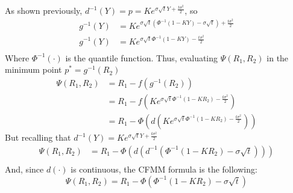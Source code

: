 \documentclass[12pt]{article}
\begin{document}
As shown previously, $d^{-1}(Y)     = p = K e^{\sigma \sqrt{t}Y + \frac{t\sigma^2}{2}}$, so
\begin{align*}
    g^{-1}(Y) & = K e^{\sigma \sqrt{t}\left(\Phi^{-1}(1-KY)-\sigma\sqrt{t}\right) + \frac{t\sigma^2}{2}} \\
    g^{-1}(Y) & = K e^{\sigma \sqrt{t}\Phi^{-1}(1-KY) - \frac{t\sigma^2}{2}}                             \\
\end{align*}
Where $\Phi^{-1}(\cdot)$ is the quantile function. \newline
Thus, evaluating $\Psi(R_1,R_2)$ in the minimum point $p^*=g^{-1}(R_2)$
\begin{align*}
    \Psi(R_1,R_2) & = R_1 - f(g^{-1}(R_2))                                                      \\
                  & = R_1 - f(K e^{\sigma \sqrt{t}\Phi^{-1}(1-KR_2) - \frac{t\sigma^2}{2}})     \\
                  & = R_1-\Phi(d(K e^{\sigma \sqrt{t}\Phi^{-1}(1-KR_2) - \frac{t\sigma^2}{2}}))
\end{align*}
But recalling that $d^{-1}(Y) = K e^{\sigma \sqrt{t}Y + \frac{t\sigma^2}{2}}$
\begin{align*}
    \Psi(R_1,R_2) & = R_1-\Phi(d(d^{-1}(\Phi^{-1}(1-KR_2)-\sigma\sqrt{t}))) \\
\end{align*}
And, since $d(\cdot)$ is continuous, the CFMM formula is the following:
\begin{equation}
    \Psi(R_1,R_2)  = R_1-\Phi(\Phi^{-1}(1-KR_2)-\sigma\sqrt{t})
\end{equation}
\end{document}
